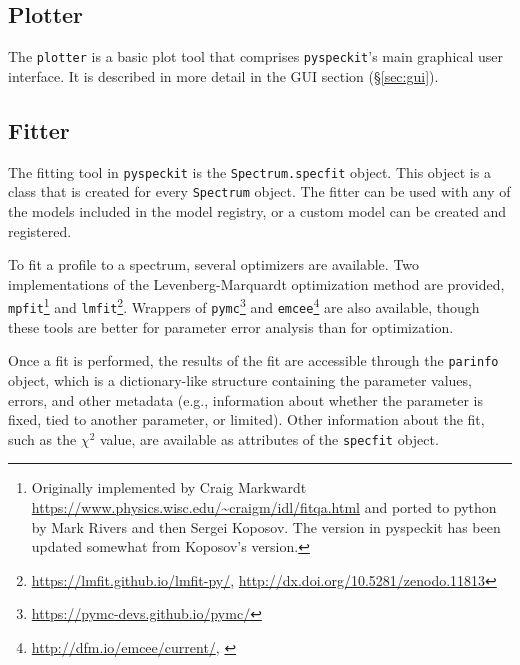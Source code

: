 \documentclass[twocolumn]{aastex62}
\newcommand{\pyspeckit}{\texttt{pyspeckit}\xspace}
\begin{document}
\subsection{Plotter}
The \texttt{plotter} is a basic plot tool that comprises \pyspeckit's main
graphical user interface.
It is described in more detail in the  GUI section (\S \ref{sec:gui}).


\subsection{Fitter}
\label{sec:fitters}
The fitting tool in \pyspeckit is the \texttt{Spectrum.specfit} object.
This object is a class that is created for every \texttt{Spectrum} object.
The fitter can be used with any of the models included in the model
registry, or a custom model can be created and registered.

To fit a profile to a spectrum, several optimizers are available.  Two
implementations of the Levenberg-Marquardt optimization method
\citep{Levenberg1944a,Marquardt1963a} are provided,
\texttt{mpfit}\footnote{Originally implemented by Craig Markwardt
\url{https://www.physics.wisc.edu/~craigm/idl/fitqa.html} and ported to python
by Mark Rivers and then Sergei Koposov.  The version in pyspeckit has been
updated somewhat from Koposov's version.} and
\texttt{lmfit}\footnote{\url{https://lmfit.github.io/lmfit-py/},
\url{http://dx.doi.org/10.5281/zenodo.11813}}.  Wrappers of
\texttt{pymc}\footnote{\url{https://pymc-devs.github.io/pymc/}} and
\texttt{emcee}\footnote{\url{http://dfm.io/emcee/current/},
\citet{Foreman-Mackey2013a}} are also available, though these tools are better
for parameter error analysis than for optimization.

Once a fit is performed, the results of the fit are accessible through the
\texttt{parinfo} object, which is a dictionary-like structure containing
the parameter values, errors, and other metadata (e.g., information about
whether the parameter is fixed, tied to another parameter, or limited).
Other information about the fit, such as the $\chi^2$ value, are available
as attributes of the \texttt{specfit} object.
\end{document}
